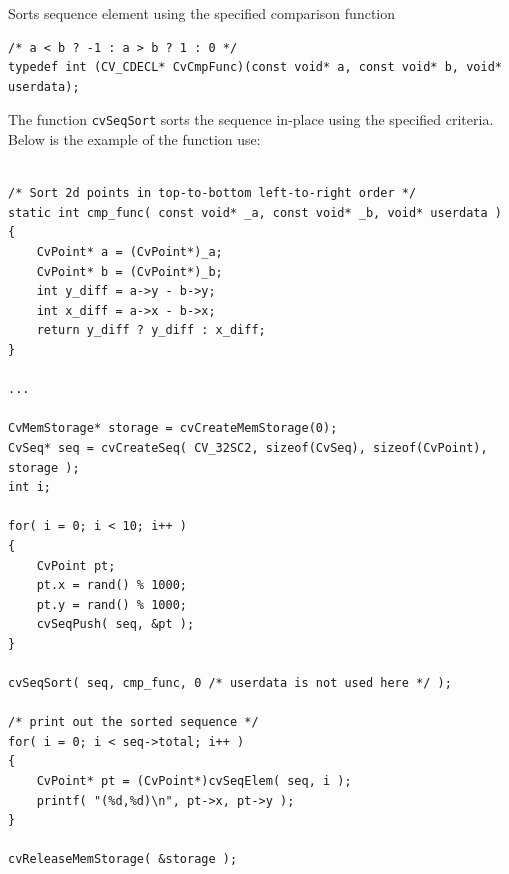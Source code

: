 \label{SeqSort}

Sorts sequence element using the specified comparison function


\begin{lstlisting}
/* a < b ? -1 : a > b ? 1 : 0 */
typedef int (CV_CDECL* CvCmpFunc)(const void* a, const void* b, void* userdata);
\end{lstlisting}

\begin{description}
\end{description}

The function \texttt{cvSeqSort} sorts the sequence in-place using the specified criteria. Below is the example of the function use:

\begin{lstlisting}

/* Sort 2d points in top-to-bottom left-to-right order */
static int cmp_func( const void* _a, const void* _b, void* userdata )
{
    CvPoint* a = (CvPoint*)_a;
    CvPoint* b = (CvPoint*)_b;
    int y_diff = a->y - b->y;
    int x_diff = a->x - b->x;
    return y_diff ? y_diff : x_diff;
}

...

CvMemStorage* storage = cvCreateMemStorage(0);
CvSeq* seq = cvCreateSeq( CV_32SC2, sizeof(CvSeq), sizeof(CvPoint), storage );
int i;

for( i = 0; i < 10; i++ )
{
    CvPoint pt;
    pt.x = rand() % 1000;
    pt.y = rand() % 1000;
    cvSeqPush( seq, &pt );
}

cvSeqSort( seq, cmp_func, 0 /* userdata is not used here */ );

/* print out the sorted sequence */
for( i = 0; i < seq->total; i++ )
{
    CvPoint* pt = (CvPoint*)cvSeqElem( seq, i );
    printf( "(%d,%d)\n", pt->x, pt->y );
}

cvReleaseMemStorage( &storage );

\end{lstlisting}


